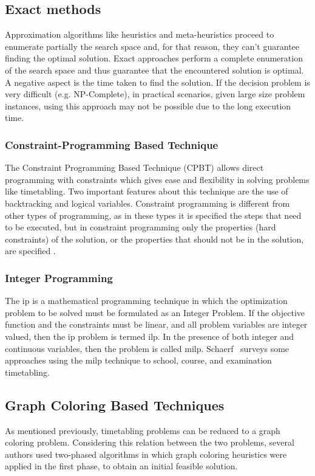 \subsection{Exact methods}
\label{subsection:exactmethods}
Approximation algorithms like heuristics and meta-heuristics proceed to enumerate partially the search space and, for that reason, they can't guarantee finding the optimal solution. Exact approaches perform a complete enumeration of the search space and thus guarantee that the encountered solution is optimal. A negative aspect is the time taken to find the solution. If the decision problem is very difficult (e.g. NP-Complete), in practical scenarios, given large size problem instances, using this approach may not be possible due to the long execution time.\\

\subsubsection{Constraint-Programming Based Technique}
The Constraint Programming Based Technique (CPBT) allows direct programming with constraints which gives ease and flexibility in solving problems like timetabling. Two important features about this technique are the use of backtracking and logical variables. Constraint programming is different from other types of programming, as in these types it is specified the steps that need to be executed, but in constraint programming only the properties (hard constraints) of the solution, or the properties that should not be in the solution, are specified \cite{Qu2009}.\\

\subsubsection{Integer Programming}
The \gls{ip} is a mathematical programming technique in which the optimization problem to be solved must be formulated as an Integer Problem. If the objective function and the constraints must be linear, and all problem variables are integer valued, then the \gls{ip} problem is termed \gls{ilp}. In the presence of both integer and continuous variables, then the problem is called \gls{milp}. Schaerf~\cite{Schaerf1999} surveys some approaches using the \gls{milp} technique to school, course, and examination timetabling.\\

\subsection{Graph Coloring Based Techniques}
\label{subsection:graphcoloring}
As mentioned previously, timetabling problems can be reduced to a graph coloring problem. Considering this relation between the two problems, several authors used two-phased algorithms in which graph coloring heuristics were applied in the first phase, to obtain an initial feasible solution.\\

